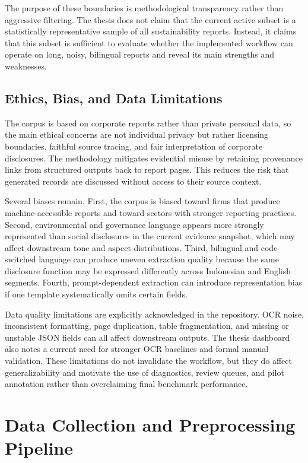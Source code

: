 \documentclass[english, online, cse, master]{dithesis}
\begin{document}
The purpose of these boundaries is methodological transparency rather than aggressive filtering. The thesis does not claim that the current active subset is a statistically representative sample of all sustainability reports. Instead, it claims that this subset is sufficient to evaluate whether the implemented workflow can operate on long, noisy, bilingual reports and reveal its main strengths and weaknesses.

\subsection{Ethics, Bias, and Data Limitations}

The corpus is based on corporate reports rather than private personal data, so the main ethical concerns are not individual privacy but rather licensing boundaries, faithful source tracing, and fair interpretation of corporate disclosures. The methodology mitigates evidential misuse by retaining provenance links from structured outputs back to report pages. This reduces the risk that generated records are discussed without access to their source context.

Several biases remain. First, the corpus is biased toward firms that produce machine-accessible reports and toward sectors with stronger reporting practices. Second, environmental and governance language appears more strongly represented than social disclosures in the current evidence snapshot, which may affect downstream tone and aspect distributions. Third, bilingual and code-switched language can produce uneven extraction quality because the same disclosure function may be expressed differently across Indonesian and English segments. Fourth, prompt-dependent extraction can introduce representation bias if one template systematically omits certain fields.

Data quality limitations are explicitly acknowledged in the repository. OCR noise, inconsistent formatting, page duplication, table fragmentation, and missing or unstable JSON fields can all affect downstream outputs. The thesis dashboard also notes a current need for stronger OCR baselines and formal manual validation. These limitations do not invalidate the workflow, but they do affect generalizability and motivate the use of diagnostics, review queues, and pilot annotation rather than overclaiming final benchmark performance.

\section{Data Collection and Preprocessing Pipeline}
\end{document}
